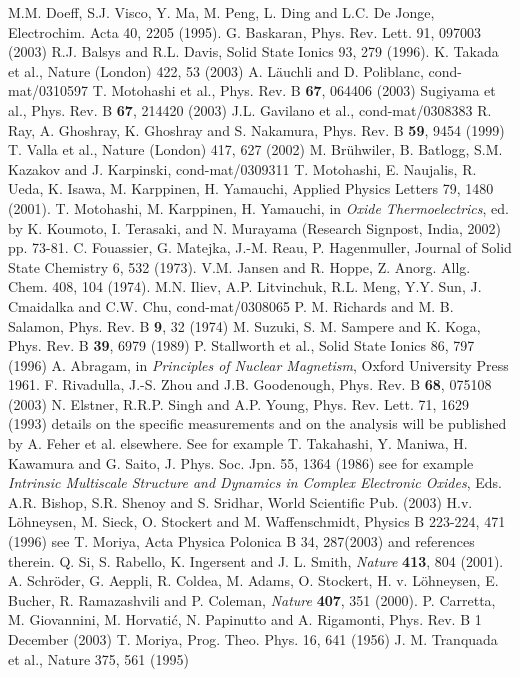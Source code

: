 \documentclass[prb,showpacs,preprintnumbers,amsmath,amssymb,floatfix]{revtex4}
\begin{document}
\begin{references}

 M.M. Doeff, S.J. Visco, Y. Ma, M. Peng, L. Ding
and L.C. De Jonge, Electrochim. Acta 40, 2205 (1995).
 G. Baskaran, Phys. Rev. Lett. 91, 097003 (2003)
 R.J. Balsys and R.L. Davis, Solid State Ionics
93, 279 (1996).
 K. Takada et al., Nature (London) 422, 53 (2003)
 A. L\"auchli and D. Poliblanc,
cond-mat/0310597
 T. Motohashi et al., Phys. Rev. B {\bf 67}, 064406
(2003)
 Sugiyama et al., Phys. Rev. B {\bf 67}, 214420
(2003)
 J.L. Gavilano et al., cond-mat/0308383
 R. Ray, A. Ghoshray, K. Ghoshray and S. Nakamura,
Phys. Rev. B {\bf 59}, 9454 (1999)
 T. Valla et al., Nature (London) 417, 627 (2002)
 M. Br\"uhwiler, B. Batlogg, S.M. Kazakov and J.
Karpinski, cond-mat/0309311
 T. Motohashi, E. Naujalis, R. Ueda, K. Isawa, M. Karppinen, H. Yamauchi,
Applied Physics Letters 79, 1480 (2001).
 T. Motohashi, M. Karppinen, H. Yamauchi, in {\it Oxide Thermoelectrics},
ed. by K. Koumoto, I. Terasaki, and N. Murayama (Research Signpost, India, 2002) pp. 73-81.
 C. Fouassier, G. Matejka, J.-M. Reau, P. Hagenmuller,
Journal of Solid State Chemistry 6, 532 (1973).
  V.M. Jansen and R. Hoppe, Z. Anorg. Allg. Chem. 408, 104 (1974).
 M.N. Iliev, A.P. Litvinchuk, R.L. Meng, Y.Y. Sun, J. Cmaidalka and C.W.
Chu, cond-mat/0308065
 P. M. Richards and M. B. Salamon, Phys. Rev. B {\bf 9}, 32 (1974)
 M. Suzuki, S. M. Sampere and K. Koga, Phys. Rev. B
{\bf 39}, 6979 (1989)
 P. Stallworth et al., Solid State Ionics 86,
797 (1996)
 A. Abragam, in {\it Principles of Nuclear Magnetism}, Oxford
University Press 1961.
 F. Rivadulla, J.-S. Zhou and J.B. Goodenough, Phys. Rev. B {\bf 68}, 075108 (2003)
 N. Elstner, R.R.P. Singh and A.P. Young, Phys.
Rev. Lett. 71, 1629 (1993)
 details on the specific measurements and on the analysis will be published by
A. Feher et al. elsewhere.
 See for example T. Takahashi, Y. Maniwa, H.
Kawamura and G. Saito, J. Phys. Soc. Jpn. 55, 1364 (1986)
 see for example {\it Intrinsic Multiscale  Structure and Dynamics in Complex
Electronic Oxides}, Eds. A.R. Bishop, S.R. Shenoy and S. Sridhar,
World Scientific Pub. (2003)
H.v. L\"ohneysen, M. Sieck, O. Stockert and M.
Waffenschmidt, Physics B 223-224, 471 (1996)
 see T. Moriya, Acta Physica Polonica B 34, 287(2003)
and references therein.
 Q. Si, S. Rabello, K. Ingersent and J. L. Smith, {\it Nature} {\bf 413}, 804
(2001).
 A. Schr\"{o}der, G. Aeppli, R. Coldea, M. Adams, O. Stockert, H. v. L\"{o}hneysen,
 E. Bucher, R. Ramazashvili and P. Coleman, {\it Nature} {\bf 407}, 351
 (2000).
P. Carretta, M. Giovannini, M. Horvati\'c, N. Papinutto and A.
Rigamonti, Phys. Rev. B 1 December (2003)
 T. Moriya, Prog. Theo. Phys. 16, 641 (1956)
 J. M. Tranquada et al., Nature 375, 561 (1995)


\end{references}
\end{document}
